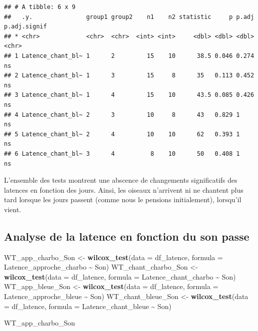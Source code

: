 \documentclass[
  french,
]{article}
\newenvironment{Shaded}{\begin{snugshade}}{\end{snugshade}}
\newcommand{\AttributeTok}[1]{\textcolor[rgb]{0.13,0.29,0.53}{#1}}
\newcommand{\FunctionTok}[1]{\textcolor[rgb]{0.13,0.29,0.53}{\textbf{#1}}}
\newcommand{\NormalTok}[1]{#1}
\newcommand{\OtherTok}[1]{\textcolor[rgb]{0.56,0.35,0.01}{#1}}
\newcommand{\SpecialCharTok}[1]{\textcolor[rgb]{0.81,0.36,0.00}{\textbf{#1}}}
\begin{document}
\begin{verbatim}
## # A tibble: 6 x 9
##   .y.               group1 group2    n1    n2 statistic     p p.adj p.adj.signif
## * <chr>             <chr>  <chr>  <int> <int>     <dbl> <dbl> <dbl> <chr>       
## 1 Latence_chant_bl~ 1      2         15    10      38.5 0.046 0.274 ns          
## 2 Latence_chant_bl~ 1      3         15     8      35   0.113 0.452 ns          
## 3 Latence_chant_bl~ 1      4         15    10      43.5 0.085 0.426 ns          
## 4 Latence_chant_bl~ 2      3         10     8      43   0.829 1     ns          
## 5 Latence_chant_bl~ 2      4         10    10      62   0.393 1     ns          
## 6 Latence_chant_bl~ 3      4          8    10      50   0.408 1     ns
\end{verbatim}

L'ensemble des tests montrent une abscence de changements significatifs
des latences en fonction des jours. Ainsi, les oiseaux n'arrivent ni ne
chantent plus tard lorsque les jours passent (comme nous le pensions
initialement), lorsqu'il vient.

\subsection{Analyse de la latence en fonction du son
passe}\label{analyse-de-la-latence-en-fonction-du-son-passe}

\begin{Shaded}
\begin{Highlighting}[]
\NormalTok{WT\_app\_charbo\_Son }\OtherTok{\textless{}{-}} \FunctionTok{wilcox\_test}\NormalTok{(}\AttributeTok{data =}\NormalTok{ df\_latence, }\AttributeTok{formula =}\NormalTok{ Latence\_approche\_charbo }\SpecialCharTok{\textasciitilde{}}\NormalTok{ Son)}
\NormalTok{WT\_chant\_charbo\_Son }\OtherTok{\textless{}{-}} \FunctionTok{wilcox\_test}\NormalTok{(}\AttributeTok{data =}\NormalTok{ df\_latence, }\AttributeTok{formula =}\NormalTok{ Latence\_chant\_charbo }\SpecialCharTok{\textasciitilde{}}\NormalTok{ Son)}
\NormalTok{WT\_app\_bleue\_Son }\OtherTok{\textless{}{-}} \FunctionTok{wilcox\_test}\NormalTok{(}\AttributeTok{data =}\NormalTok{ df\_latence, }\AttributeTok{formula =}\NormalTok{ Latence\_approche\_bleue }\SpecialCharTok{\textasciitilde{}}\NormalTok{ Son)}
\NormalTok{WT\_chant\_bleue\_Son }\OtherTok{\textless{}{-}} \FunctionTok{wilcox\_test}\NormalTok{(}\AttributeTok{data =}\NormalTok{ df\_latence, }\AttributeTok{formula =}\NormalTok{ Latence\_chant\_bleue }\SpecialCharTok{\textasciitilde{}}\NormalTok{ Son)}

\NormalTok{WT\_app\_charbo\_Son}
\end{Highlighting}
\end{Shaded}
\end{document}
